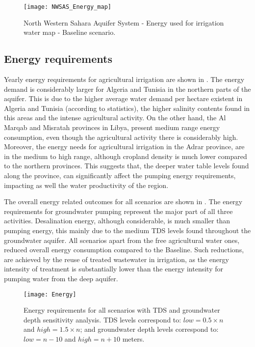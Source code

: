 \begin{figure*}[!b]
	\centering
	\texttt{[image: NWSAS\_Energy\_map]}
	\caption[NWSAS energy used for irrigation water map - Baseline scenario]{North Western Sahara Aquifer System - Energy used for irrigation water map - Baseline scenario.}
	\label{fig:energy_map}
\end{figure*}

\subsection{Energy requirements}
Yearly energy requirements for agricultural irrigation are shown in . The energy demand is considerably larger for Algeria and Tunisia in the northern parts of the aquifer. This is due to the higher average water demand per hectare existent in Algeria and Tunisia (according to statistics), the higher salinity contents found in this areas and the intense agricultural activity. On the other hand, the Al Marqab and Misratah provinces in Libya, present medium range energy consumption, even though the agricultural activity there is considerably high. Moreover, the energy needs for agricultural irrigation in the Adrar province, are in the medium to high range, although cropland density is much lower compared to the northern provinces. This suggests that, the deeper water table levels found along the province, can significantly affect the pumping energy requirements, impacting as well the water productivity of the region.

The overall energy related outcomes for all scenarios are shown in . The energy requirements for groundwater pumping represent the major part of all three activities. Desalination energy, although considerable, is much smaller than pumping energy, this mainly due to the medium TDS levels found throughout the groundwater aquifer. All scenarios apart from the free agricultural water ones, reduced overall energy consumption compared to the Baseline. Such reductions, are achieved by the reuse of treated wastewater in irrigation, as the energy intensity of treatment is substantially lower than the energy intensity for pumping water from the deep aquifer.

\begin{figure*}[!t]
\texttt{[image: Energy]}
\caption{Energy requirements for all scenarios with TDS and groundwater depth sensitivity analysis. TDS levels correspond to: $low=0.5\times n$ and $high=1.5\times n$; and groundwater depth levels correspond to: $low=n-10$ and $high=n+10$ meters.}
\label{fig:energy}
\end{figure*}

